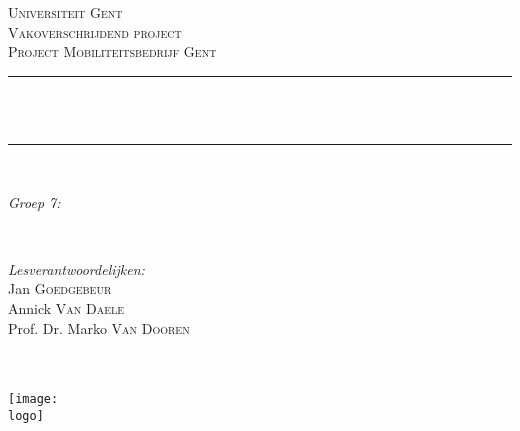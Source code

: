 \newcommand{\HRule}{     %
	\rule{\linewidth}{0.5mm}
}

\author{
	Tr\'esor Akimana\\
	Nick De Smedt\\
	Tom Hoet\\
	Dean Parmentier\\
	Simon Scheerlynck\\
	Xavier Seyssens\\
	Jonas Van Wilder\\
	Lennart Vermeir
}
\date{2015-2016}

\makeatletter		%
\begin{titlepage}

		\center
		 
		\textsc{\LARGE Universiteit Gent}\\[1.5cm]
		\textsc{\Large Vakoverschrijdend project}\\[0.5cm]
		\textsc{\large Project Mobiliteitsbedrijf Gent}\\[0.5cm]

		\HRule \\[0.4cm]
		{ \huge \bfseries \@title }\\[0.4cm]
		\HRule \\[1.5cm]
		 
		\begin{minipage}{0.4\textwidth}
			\begin{flushleft} \large
				\emph{Groep 7:}\\
				\@author
			\end{flushleft}
		\end{minipage}
			~
		\begin{minipage}{0.4\textwidth}
			\begin{flushright} \large
				\emph{Lesverantwoordelijken:}\\
				Jan \textsc{Goedgebeur}\\
				Annick \textsc{Van Daele}\\
				Prof. Dr. Marko \textsc{Van Dooren}
			\end{flushright}
		\end{minipage}\\[4cm]


		{\large \@date}\\[1cm]


		\texttt{[image: \\logo]}

\end{titlepage}
\makeatother %